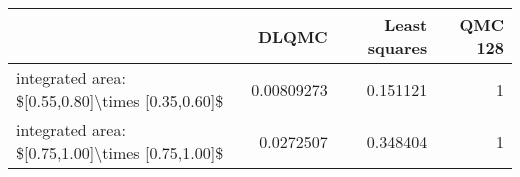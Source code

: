 \begin{tabular}{lrrr}
\toprule
                                                  &      DLQMC &   Least squares &   QMC 128 \\
\midrule
 integrated area: \$[0.55,0.80]\textbackslash{}times [0.35,0.60]\$ & 0.00809273 &        0.151121 &         1 \\
 integrated area: \$[0.75,1.00]\textbackslash{}times [0.75,1.00]\$ & 0.0272507  &        0.348404 &         1 \\
\bottomrule
\end{tabular}
